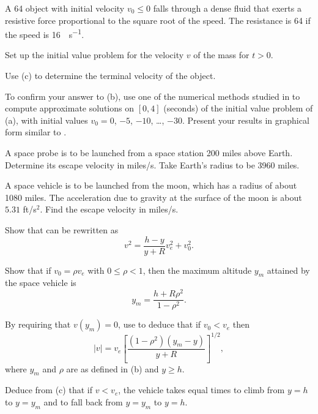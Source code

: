 \begin{exerciselist}
\item\label{exer:4.3.16}A \qty{64}{\pound} object with initial velocity $v_0\le0$ falls through a dense
fluid that exerts a resistive force proportional to the square root of
the speed. The resistance is \qty{64}{\pound} if the speed is \qty{16}{\feet\per\second}.

\begin{alist}
\item %
Set up the initial value problem for the velocity $v$ of the mass for
$t>0$.
\item %
Use (c) to determine the terminal velocity of
the object.
\item %
\Cex
To confirm your answer to (b), use one of the numerical methods
studied in  to compute approximate
solutions on
$[0,4]$ (seconds) of the initial value problem of (a), with
initial values $v_0=0$, $-5$, $-10$, \dots, $-30$. Present your results in
graphical form similar to .
\end{alist}


\item\label{exer:4.3.17}A space probe is to be launched from a space station 200
miles above Earth.  Determine its escape velocity in
miles/s.  Take Earth's radius to be 3960 miles.

\item\label{exer:4.3.18}A space vehicle is to be launched from the moon, which has a
radius of about 1080 miles.  The acceleration due to
gravity at the surface of the moon is about $5.31$
ft/s$^2$.  Find the escape velocity in miles/s.

\item\label{exer:4.3.19}\begin{alist}
\item %
Show that   can be rewritten as
\[
v^2=\frac{h-y}{y+R} v^2_e+v_0^2.
\]
\item %
Show that if $v_0=\rho v_e$ with $ 0\le \rho < 1$, then
the maximum altitude $y_m$ attained by the space
vehicle is
\[
y_m=\frac{h+R\rho^2}{1-\rho^2}.
\]
\item %
By requiring that $v(y_m)=0$, use  to
deduce that if $v_0 < v_e$ then
\[
|v|=v_e\left[\frac{(1-\rho^2)(y_m-y)}{y+R}\right]^{1/2},
\]
where $y_m$ and $\rho$ are as defined in (b) and
$y \ge h$.
\item %
Deduce from (c) that if $v < v_e$,  the vehicle takes
equal times to climb from $y=h$ to $y=y_m$ and to
fall back from $y=y_m$ to $y=h$.
\end{alist}


\end{exerciselist}
